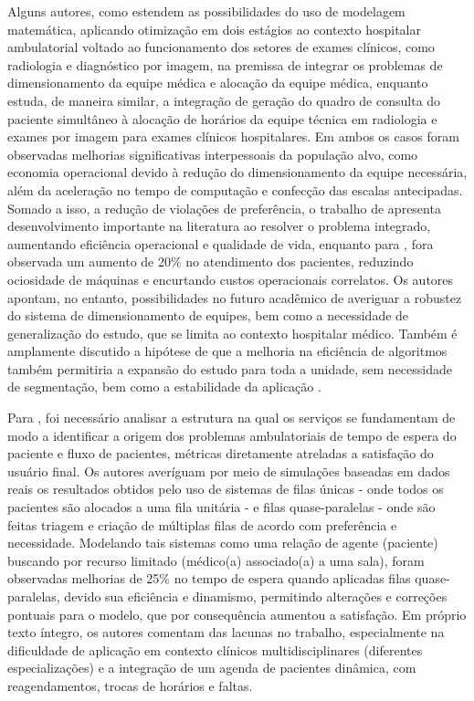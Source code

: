 Alguns autores, como  estendem as possibilidades do uso de modelagem matemática, aplicando otimização em dois estágios ao contexto hospitalar ambulatorial voltado ao funcionamento dos setores de exames clínicos, como radiologia e diagnóstico por imagem, na premissa de integrar os problemas de dimensionamento da equipe médica e alocação da equipe médica, enquanto  estuda, de maneira similar, a integração de geração do quadro de consulta do paciente simultâneo à alocação de horários da equipe técnica em radiologia e exames por imagem para exames clínicos hospitalares. Em ambos os casos foram observadas melhorias significativas interpessoais da população alvo, como economia operacional devido à redução do dimensionamento da equipe necessária, além da aceleração no tempo de computação e confecção das escalas antecipadas. Somado a isso, a redução de violações de preferência, o trabalho de  apresenta desenvolvimento importante na literatura ao resolver o problema integrado, aumentando eficiência operacional e qualidade de vida, enquanto para , fora observada um aumento de 20\% no atendimento dos pacientes, reduzindo ociosidade de máquinas e encurtando custos operacionais correlatos. Os autores apontam, no entanto, possibilidades no futuro acadêmico de averiguar a robustez do sistema de dimensionamento de equipes, bem como a necessidade de generalização do estudo, que se limita ao contexto hospitalar médico. Também é amplamente discutido a hipótese de que a melhoria na eficiência de algoritmos também permitiria a expansão do estudo para toda a unidade, sem necessidade de segmentação, bem como a estabilidade da aplicação \cite{BentayebLahrichiRousseau2023}.


Para , foi necessário analisar a estrutura na qual os serviços se fundamentam de modo a identificar a origem dos problemas ambulatoriais de tempo de espera do paciente e fluxo de pacientes, métricas diretamente atreladas a satisfação do usuário final. Os autores averíguam por meio de simulações baseadas em dados reais os resultados obtidos pelo uso de sistemas de filas únicas - onde todos os pacientes são alocados a uma fila unitária - e filas quase-paralelas - onde são feitas triagem e criação de múltiplas filas de acordo com preferência e necessidade. Modelando tais sistemas como uma relação de agente (paciente) buscando por recurso limitado (médico(a) associado(a) a uma sala), foram observadas melhorias de 25\% no tempo de espera quando aplicadas filas quase-paralelas, devido sua eficiência e dinamismo, permitindo alterações e correções pontuais para o modelo, que por consequência aumentou a satisfação.
Em próprio texto íntegro, os autores comentam das lacunas no trabalho, especialmente na dificuldade de aplicação em contexto clínicos multidisciplinares (diferentes especializações) e a integração de um agenda de pacientes dinâmica, com reagendamentos, trocas de horários e faltas.

